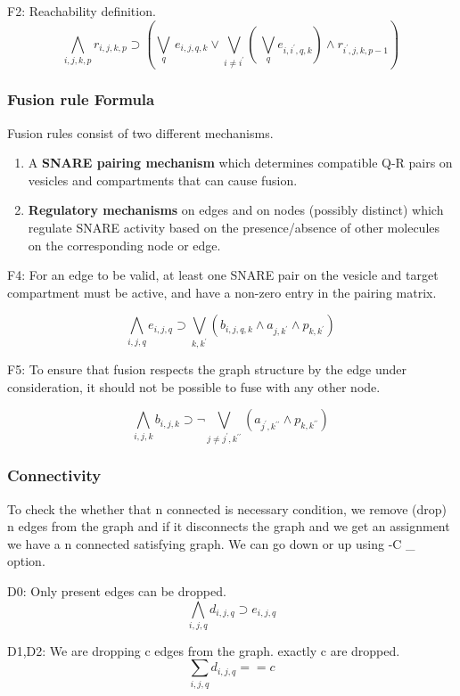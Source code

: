 F2: Reachability definition.
\[ \bigwedge\limits_{i,j,k,p} r_{i,j,k,p} \supset (\bigvee_{q} \, e_{i,j,q,k} \lor \bigvee_{i\neq i^{\prime}} ( \, \bigvee_{q} e_{i,i^{\prime},q,k}) \land r_{i^{\prime},j,k,p-1} ) \, \]


\subsubsection{ Fusion rule Formula}

Fusion rules consist of two different mechanisms.

\begin{enumerate}
\item  A \textbf{SNARE pairing mechanism} which determines compatible Q-R pairs on vesicles and compartments that can cause fusion.
\item \textbf{Regulatory mechanisms} on edges and on nodes (possibly distinct) which regulate SNARE activity based on the presence/absence of other molecules on the corresponding node or edge.
\end{enumerate}

F4: For an edge to be valid, at least one SNARE pair on the vesicle and target compartment must be active, and have a non-zero entry in the pairing matrix.  

\[ \bigwedge\limits_{i,j,q} e_{i,j,q} \supset \bigvee_{k,k^{\prime}} (b_{i,j,q,k} \land a_{j,k^{\prime}} \land p_{k,k^{\prime}}) \, \]

F5: To ensure that fusion respects the graph structure by the edge under consideration, it should not be possible to fuse with any other node.

\[ \bigwedge\limits_{i,j,k} b_{i,j,k} \supset \neg \bigvee_{j \neq j^{\prime}, k^{\prime\prime}} ( a_{j^{\prime},k^{\prime\prime}} \land p_{k,k^{\prime\prime}}) \, \]


\subsubsection{Connectivity}
To check the whether that n connected is necessary condition, we remove (drop) n edges from the graph and if it disconnects the graph and we get an assignment we have a n connected satisfying graph. We can go down or up using -C \_ option.  \newline 

D0: Only present edges can be dropped.
\[ \bigwedge\limits_{i,j,q} d_{i,j,q} \supset e_{i,j,q}  \]

D1,D2: We are dropping c edges from the graph. exactly c are dropped.
\[ \sum_{i,j,q} d_{i,j,q} == c \]

